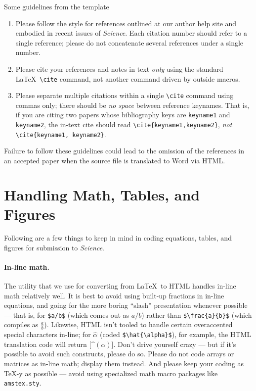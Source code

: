 \documentclass[12pt]{article}
\begin{document}




\newpage

Some guidelines from the template
\vspace{5cm}
\begin{enumerate}
\item Please follow the style for references outlined at our author
  help site and embodied in recent issues of {\it Science}.  Each
  citation number should refer to a single reference; please do not
  concatenate several references under a single number.
\item Please cite your references and notes in text {\it only\/} using
  the standard \LaTeX\ \verb+\cite+ command, not another command
  driven by outside macros.
\item Please separate multiple citations within a single \verb+\cite+
  command using commas only; there should be {\it no space\/}
  between reference keynames.  That is, if you are citing two
  papers whose bibliography keys are \texttt{keyname1} and
  \texttt{keyname2}, the in-text cite should read
  \verb+\cite{keyname1,keyname2}+, {\it not\/}
  \verb+\cite{keyname1, keyname2}+.
\end{enumerate}

\noindent Failure to follow these guidelines could lead
to the omission of the references in an accepted paper when the source
file is translated to Word via HTML.

\section*{Handling Math, Tables, and Figures}

Following are a few things to keep in mind in coding equations,
tables, and figures for submission to {\it Science}.

\paragraph*{In-line math.}  The utility that we use for converting
from \LaTeX\ to HTML handles in-line math relatively well.  It is best
to avoid using built-up fractions in in-line equations, and going for
the more boring ``slash'' presentation whenever possible --- that is,
for \verb+$a/b$+ (which comes out as $a/b$) rather than
\verb+$\frac{a}{b}$+ (which compiles as $\frac{a}{b}$).  Likewise,
HTML isn't tooled to handle certain overaccented special characters
in-line; for $\hat{\alpha}$ (coded \verb+$\hat{\alpha}$+), for
example, the HTML translation code will return [\^{}$(\alpha)$].
Don't drive yourself crazy --- but if it's possible to avoid such
constructs, please do so.  Please do not code arrays or matrices as
in-line math; display them instead.  And please keep your coding as
\TeX-y as possible --- avoid using specialized math macro packages
like \texttt{amstex.sty}.
\end{document}
